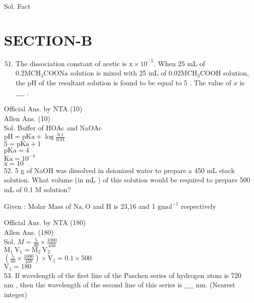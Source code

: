 \documentclass[10pt]{article}
\begin{document}
Sol. Fact

\section*{SECTION-B}
\begin{enumerate}
  \setcounter{enumi}{50}
  \item The dissociation constant of acetic is \(\mathrm{x} \times 10^{-5}\). When 25 mL of \(0.2 \mathrm{M} \mathrm{CH}_{3} \mathrm{COONa}\) solution is mixed with 25 mL of \(0.02 \mathrm{M} \mathrm{CH}_{3} \mathrm{COOH}\) solution, the pH of the resultant solution is found to be equal to 5 . The value of \(x\) is \(\_\_\_\_\) .
\end{enumerate}

Official Ans. by NTA (10)\\
Allen Ans. (10)\\
Sol. Buffer of HOAc and NaOAc\\
\(\mathrm{pH}=\mathrm{pKa}+\log \frac{0.1}{0.01}\)\\
\(5=\mathrm{pKa}+1\)\\
\(\mathrm{pKa}=4\)\\
\(\mathrm{Ka}=10^{-4}\)\\
\(\mathrm{x}=10\)\\
52. 5 g of NaOH was dissolved in deionized water to prepare a 450 mL stock solution. What volume (in mL ) of this solution would be required to prepare 500 mL of 0.1 M solution?

Given : Molar Mass of \(\mathrm{Na}, \mathrm{O}\) and H is 23,16 and 1 \(\mathrm{g} \mathrm{mol}^{-1}\) respectively

Official Ans. by NTA (180)\\
Allen Ans. (180)\\
Sol. \(M=\frac{5}{40} \times \frac{1000}{450}\)\\
\(\mathrm{M}_{1} \mathrm{~V}_{1}=\mathrm{M}_{2} \mathrm{~V}_{2}\)\\
\(\left(\frac{5}{40} \times \frac{1000}{450}\right) \times \mathrm{V}_{1}=0.1 \times 500\)\\
\(\mathrm{V}_{1}=180\)\\
53. If wavelength of the first line of the Paschen series of hydrogen atom is 720 nm , then the wavelength of the second line of this series is \(\_\_\_\_\) nm. (Nearest integer)
\end{document}
